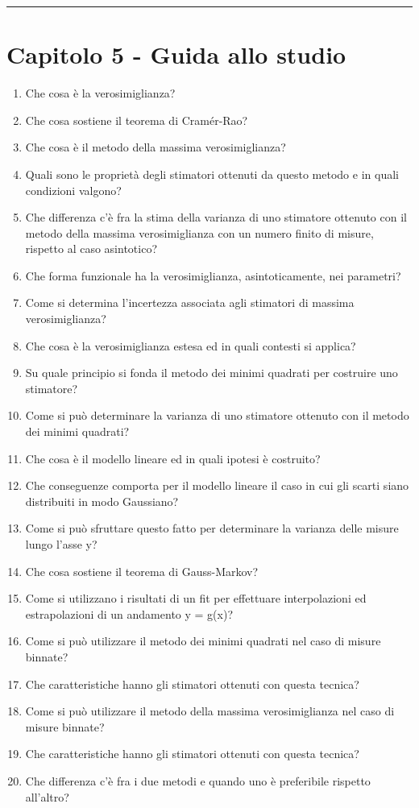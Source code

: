 \vspace{0.5cm}
\par\noindent\rule{\textwidth}{2pt}

\section{Capitolo 5 - Guida allo studio}

\begin{enumerate}
	\item Che cosa \`{e} la verosimiglianza?
	\item Che cosa sostiene il teorema di Cram\'{e}r-Rao?
	\item Che cosa \`{e} il metodo della massima verosimiglianza?
	\item Quali sono le propriet\`{a} degli stimatori ottenuti da questo metodo e in quali condizioni   valgono?
	\item Che differenza c'\`{e} fra la stima della varianza di uno stimatore ottenuto con il metodo della massima verosimiglianza con un numero finito di misure, rispetto al caso asintotico?
	\item Che forma funzionale ha la verosimiglianza, asintoticamente, nei parametri?
	\item Come si determina l'incertezza associata agli stimatori di massima verosimiglianza?
	\item Che cosa \`{e} la verosimiglianza estesa ed in quali contesti si applica?
	\item Su quale principio si fonda il metodo dei minimi quadrati per costruire uno stimatore?
	\item Come si può determinare la varianza di uno stimatore ottenuto con il metodo dei minimi quadrati?
	\item Che cosa \`{e} il modello lineare ed in quali ipotesi \`{e} costruito?
	\item Che conseguenze comporta per il modello lineare il caso in cui gli scarti siano distribuiti in modo Gaussiano?
	\item Come si può sfruttare questo fatto per determinare la varianza delle misure lungo l'asse y?
	\item Che cosa sostiene il teorema di Gauss-Markov?
	\item Come si utilizzano i risultati di un fit per effettuare interpolazioni ed estrapolazioni di un 	andamento y = g(x)?
	\item Come si può utilizzare il metodo dei minimi quadrati nel caso di misure binnate?
	\item Che caratteristiche hanno gli stimatori ottenuti con questa tecnica?
	\item Come si può utilizzare il metodo della massima verosimiglianza nel caso di misure binnate?
	\item Che caratteristiche hanno gli stimatori ottenuti con questa tecnica?
	\item Che differenza c'\`{e} fra i due metodi e quando uno \`{e} preferibile rispetto all'altro?

\end{enumerate}

